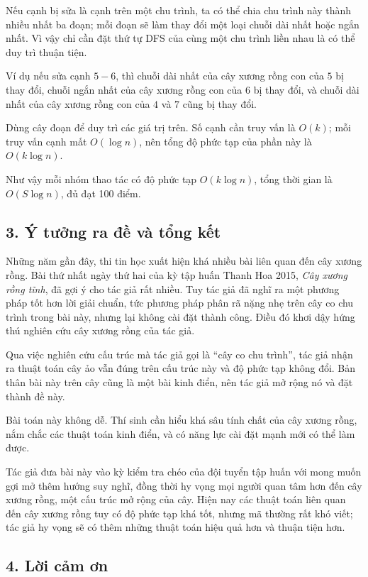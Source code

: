 \documentclass[11pt]{article}
\begin{document}
Nếu cạnh bị sửa là cạnh trên một chu trình, ta có thể chia chu trình này thành
nhiều nhất ba đoạn; mỗi đoạn sẽ làm thay đổi một loại chuỗi dài nhất hoặc
ngắn nhất. Vì vậy chỉ cần đặt thứ tự DFS của cùng một chu trình liền nhau là
có thể duy trì thuận tiện.

Ví dụ nếu sửa cạnh \(5-6\), thì chuỗi dài nhất của cây xương rồng con của
\(5\) bị thay đổi, chuỗi ngắn nhất của cây xương rồng con của \(6\) bị thay
đổi, và chuỗi dài nhất của cây xương rồng con của \(4\) và \(7\) cũng bị thay
đổi.

Dùng cây đoạn để duy trì các giá trị trên. Số cạnh cần truy vấn là \(O(k)\);
mỗi truy vấn cạnh mất \(O(\log n)\), nên tổng độ phức tạp của phần này là
\(O(k\log n)\).

Như vậy mỗi nhóm thao tác có độ phức tạp \(O(k\log n)\), tổng thời gian là
\(O(S\log n)\), đủ đạt 100 điểm.

\subsection*{3. Ý tưởng ra đề và tổng kết}

Những năm gần đây, thi tin học xuất hiện khá nhiều bài liên quan đến cây xương
rồng. Bài thứ nhất ngày thứ hai của kỳ tập huấn Thanh Hoa 2015, \emph{Cây
xương rồng tĩnh}, đã gợi ý cho tác giả rất nhiều. Tuy tác giả đã nghĩ ra một
phương pháp tốt hơn lời giải chuẩn, tức phương pháp phân rã nặng nhẹ trên cây
co chu trình trong bài này, nhưng lại không cài đặt thành công. Điều đó khơi
dậy hứng thú nghiên cứu cây xương rồng của tác giả.

Qua việc nghiên cứu cấu trúc mà tác giả gọi là ``cây co chu trình'', tác giả
nhận ra thuật toán cây ảo vẫn đúng trên cấu trúc này và độ phức tạp không đổi.
Bản thân bài này trên cây cũng là một bài kinh điển, nên tác giả mở rộng nó
và đặt thành đề này.

Bài toán này không dễ. Thí sinh cần hiểu khá sâu tính chất của cây xương rồng,
nắm chắc các thuật toán kinh điển, và có năng lực cài đặt mạnh mới có thể làm
được.

Tác giả đưa bài này vào kỳ kiểm tra chéo của đội tuyển tập huấn với mong muốn
gợi mở thêm hướng suy nghĩ, đồng thời hy vọng mọi người quan tâm hơn đến cây
xương rồng, một cấu trúc mở rộng của cây. Hiện nay các thuật toán liên quan
đến cây xương rồng tuy có độ phức tạp khá tốt, nhưng mã thường rất khó viết;
tác giả hy vọng sẽ có thêm những thuật toán hiệu quả hơn và thuận tiện hơn.

\subsection*{4. Lời cảm ơn}
\end{document}
